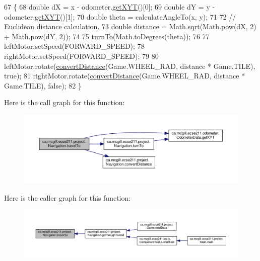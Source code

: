 \begin{DoxyCode}
67                                            \{
68     \textcolor{keywordtype}{double} dX = x - odometer.\hyperlink{classca_1_1mcgill_1_1ecse211_1_1odometer_1_1_odometer_data_a8f40f0264c68f0cbed4fff1723ae7863}{getXYT}()[0];
69     \textcolor{keywordtype}{double} dY = y - odometer.\hyperlink{classca_1_1mcgill_1_1ecse211_1_1odometer_1_1_odometer_data_a8f40f0264c68f0cbed4fff1723ae7863}{getXYT}()[1];
70     \textcolor{keywordtype}{double} theta = calculateAngleTo(x, y);
71 
72     \textcolor{comment}{// Euclidean distance calculation.}
73     \textcolor{keywordtype}{double} distance = Math.sqrt(Math.pow(dX, 2) + Math.pow(dY, 2));
74 
75     \hyperlink{classca_1_1mcgill_1_1ecse211_1_1project_1_1_navigation_a3bbe0645f2b3b3d0986b4a707fb5a00c}{turnTo}(Math.toDegrees(theta));
76 
77     leftMotor.setSpeed(FORWARD\_SPEED);
78     rightMotor.setSpeed(FORWARD\_SPEED);
79 
80     leftMotor.rotate(\hyperlink{classca_1_1mcgill_1_1ecse211_1_1project_1_1_navigation_ac9e260bcd619ffa4820d7d0de7ea1c12}{convertDistance}(Game.WHEEL\_RAD, distance * Game.TILE), \textcolor{keyword}{true});
81     rightMotor.rotate(\hyperlink{classca_1_1mcgill_1_1ecse211_1_1project_1_1_navigation_ac9e260bcd619ffa4820d7d0de7ea1c12}{convertDistance}(Game.WHEEL\_RAD, distance * Game.TILE), \textcolor{keyword}{false});
82   \}
\end{DoxyCode}
Here is the call graph for this function\+:
\nopagebreak
\begin{figure}[H]
\begin{center}
\leavevmode
\includegraphics[width=350pt]{classca_1_1mcgill_1_1ecse211_1_1project_1_1_navigation_ad89b3dd084d81b4ec4d89ea73ba13eaa_cgraph}
\end{center}
\end{figure}
Here is the caller graph for this function\+:
\nopagebreak
\begin{figure}[H]
\begin{center}
\leavevmode
\includegraphics[width=350pt]{classca_1_1mcgill_1_1ecse211_1_1project_1_1_navigation_ad89b3dd084d81b4ec4d89ea73ba13eaa_icgraph}
\end{center}
\end{figure}
